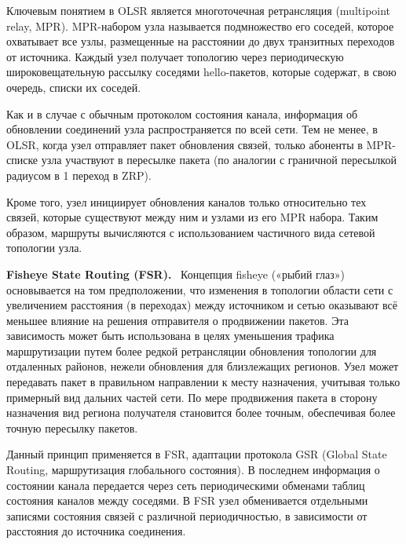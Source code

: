 \documentclass[14pt,a4paper,titlepage]{extarticle}
\renewcommand{\paragraph}[1]{\textbf{#1.}~}
\begin{document}
Ключевым понятием в OLSR является многоточечная ретрансляция (multipoint relay, MPR). MPR-набором узла называется подмножество его соседей, которое охватывает все узлы, размещенные на расстоянии до двух транзитных переходов от источника. Каждый узел получает топологию через периодическую широковещательную рассылку соседями hello-пакетов, которые содержат, в свою очередь, списки их соседей. 

Как и в случае с обычным протоколом состояния канала, информация об обновлении соединений узла распространяется по всей сети. Тем не менее, в OLSR, когда узел отправляет пакет обновления связей, только абоненты в MPR-списке узла участвуют в пересылке пакета (по аналогии с граничной пересылкой радиусом в 1 переход в ZRP).

Кроме того, узел инициирует обновления каналов только относительно тех связей, которые существуют между ним и узлами из его MPR набора. Таким образом, маршруты вычисляются с использованием частичного вида сетевой топологии узла.

\paragraph{Fisheye State Routing (FSR)}
Концепция fisheye («рыбий глаз») основывается на том предположении, что изменения в топологии области сети с увеличением расстояния (в переходах) между источником и сетью оказывают всё меньшее влияние на решения отправителя о продвижении пакетов. Эта зависимость может быть использована в целях уменьшения трафика маршрутизации путем более редкой ретрансляции обновления топологии для отдаленных районов, нежели обновления для близлежащих регионов. Узел может передавать пакет в правильном направлении к месту назначения, учитывая только примерный вид дальних частей сети. По мере продвижения пакета в сторону назначения вид региона получателя становится более точным, обеспечивая более точную пересылку пакетов.

Данный принцип применяется в FSR, адаптации протокола GSR (Global State Routing, маршрутизация глобального состояния). В последнем информация о состоянии канала передается через сеть периодическими обменами таблиц состояния каналов между соседями. В FSR узел обменивается отдельными записями состояния связей с различной периодичностью, в зависимости от расстояния до источника соединения.
\end{document}
